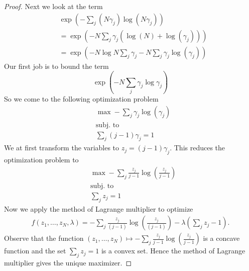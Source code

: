 \documentclass[12pt]{article}
\numberwithin{equation}{section}
\numberwithin{equation}{section}
\theoremstyle{definition}
\renewcommand{\1}{\bf 1}
\begin{document}
\begin{proof}
Next we look at the term 
\begin{equation}\label{eq:termentropy}
\begin{split}
&\exp\left( - \sum_{j}\left(N\gamma_{j}\right)\log\left( N\gamma_{j}\right) \right)\\
& = \exp \left( - N \sum_{j} \gamma_{j}\left(\log(N)+ \log(\gamma_{j})\right) \right)\\
& = \exp \left( - N\log N \sum_{j}\gamma_{j} - N \sum_{j} \gamma_{j}\log(\gamma_{j}) \right)
\end{split}
\end{equation}
Our first job is to bound the term 
\[
\exp\left( -N \sum_{j} \gamma_{j}\log \gamma_{j} \right)
\]
So we come to the following optimization problem 
\begin{equation}\label{eq:optentropy}
\begin{array}{ll}
&\max -\sum_{j}\gamma_{j}\log(\gamma_{j})\\
&\text{subj. to} \\
& \sum_{j}(j-1)\gamma_{j}=1 
\end{array}
\end{equation}
We at first transform the variables to $z_{j}= (j-1)\gamma_{j}$. This reduces the optimization problem to 
\begin{equation}\label{eq:optentropytransformed}
\begin{array}{ll}
&\max -\sum_{j}\frac{z_{j}}{j-1}\log\left(\frac{z_{j}}{j-1}\right)\\
&\text{subj. to} \\
& \sum_{j} z_{j}=1 
\end{array}
\end{equation}
Now we apply the method of Lagrange multiplier to optimize 
\begin{equation}\label{eq:lagrangeentropy}
\begin{split}
f(z_{1},\ldots, z_{N}, \lambda)= - \sum_{j}\frac{z_{j}}{(j-1)}\log \left( \frac{z_{j}}{(j-1)} \right) -\lambda \left( \sum_{j} z_{j}-1 \right).
\end{split}
\end{equation}
Observe that the function $(z_{1},\ldots,z_{N})\mapsto -\sum_{j}\frac{z_{j}}{j-1}\log\left(\frac{z_{j}}{j-1}\right)$ is a concave function and the set $\sum_{j}z_{j}=1$ is a convex set. Hence the method of Lagrange multiplier gives the unique maximizer.


\end{proof}
\end{document}
